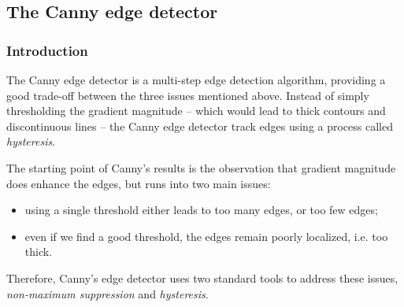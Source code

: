 \subsection{The Canny edge detector}
\subsubsection{Introduction}
The Canny edge detector is a multi-step edge detection algorithm, providing a good trade-off between the three issues mentioned above. Instead of simply thresholding the gradient magnitude -- which would lead to thick contours and discontinuous lines -- the Canny edge detector track edges using a process called \emph{hysteresis}.

The starting point of Canny's results is the observation that gradient magnitude does enhance the edges, but runs into two main issues:
\begin{itemize}
    \item using a single threshold either leads to too many edges, or too few edges;
    \item even if we find a good threshold, the edges remain poorly localized, i.e. too thick.
\end{itemize}
Therefore, Canny's edge detector uses two standard tools to address these issues, \emph{non-maximum suppression} and \emph{hysteresis}.

